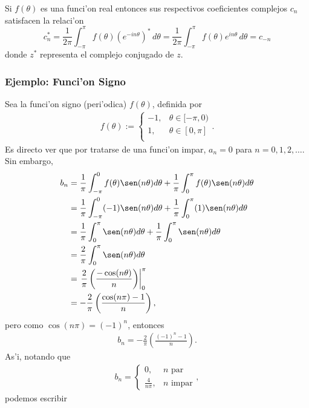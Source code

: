 Si $f(\theta)$ es una funci'on real entonces sus respectivos coeficientes complejos $c_n$ satisfacen la relaci'on
\begin{equation}
c_n^\ast=\frac{1}{2\pi}\int_{-\pi}^\pi f(\theta)(e^{-in\theta})^\ast\,d\theta
=\frac{1}{2\pi}\int_{-\pi}^\pi f(\theta) e^{in\theta}\,d\theta=c_{-n} 
\end{equation}
donde $z^\ast$ representa el complejo conjugado de $z$.

\subsubsection{Ejemplo: Funci'on Signo}
Sea la funci'on signo (peri'odica) $f(\theta)$, definida por 
\begin{align}
f(\theta):=\left\{
\begin{array}{rl}
-1,& \theta \in [-\pi,0)\\
1,& \theta \in [0,\pi]\\
\end{array}\right. .
\end{align}
Es directo ver que por tratarse de una funci'on impar, $a_{n}=0$ para $n=0,1,2,\ldots$. Sin embargo,
\begin{align}
b_{n}&=\frac{1}{\pi}\int_{-\pi}^{0}f(\theta) \sen(n\theta)d\theta+\frac{1}{\pi}\int_{0}^{\pi}f(\theta) \sen(n\theta)d\theta\\
&=\frac{1}{\pi}\int_{-\pi}^{0}(-1) \sen(n\theta)d\theta+\frac{1}{\pi}\int_{0}^{\pi} (1) \sen(n\theta)d\theta\\
&=\frac{1}{\pi}\int_{0}^{\pi} \sen(n\theta)d\theta+\frac{1}{\pi}\int_{0}^{\pi} \sen(n\theta)d\theta\\
&=\frac{2}{\pi}\int_{0}^{\pi}\sen(n\theta)d\theta\\
&=\left.\frac{2}{\pi}\left(\frac{-\cos(n\theta)}{n}\right)\right|_{0}^{\pi}\\
&=-\frac{2}{\pi}\left(\frac{\cos(n\pi)-1}{n}\right),
\end{align}
pero como $\cos(n\pi)=(-1)^{n}$, entonces
\begin{align}
b_{n}=-\frac{2}{\pi}\left(\frac{(-1)^{n}-1}{n}\right).
\end{align}
As'i, notando que
\begin{align}
b_{n}=\left\{
\begin{array}{cl}
0, &n\text{ par}\\
\frac{4}{n \pi}, &n\text{ impar}
\end{array}
\right.,
\end{align}
podemos escribir

